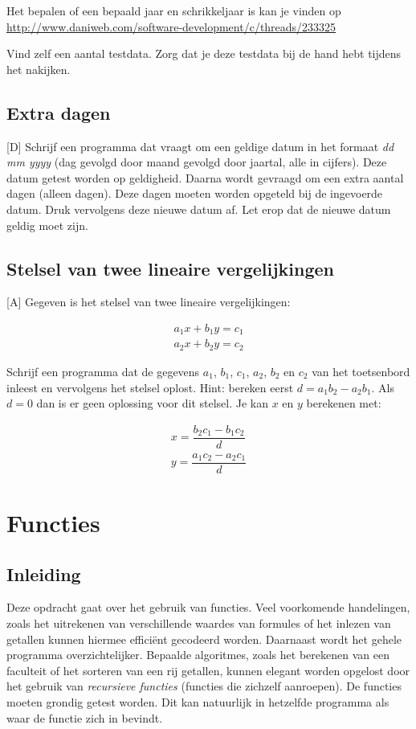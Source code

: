 \documentclass[a4paper,10pt,fleqn,twoside]{article}
\begin{document}
Het bepalen of een bepaald jaar en schrikkeljaar is kan je vinden op \url{http://www.daniweb.com/software-development/c/threads/233325}

Vind zelf een aantal testdata. Zorg dat je deze testdata bij de hand hebt tijdens het nakijken.

\subsection{Extra dagen}[D]
Schrijf een programma dat vraagt om een geldige datum in het formaat \textsl{dd mm yyyy} (dag gevolgd door maand gevolgd door jaartal, alle in cijfers). Deze datum getest worden op geldigheid. Daarna wordt gevraagd om een extra aantal dagen (alleen dagen). Deze dagen moeten worden opgeteld bij de ingevoerde datum. Druk vervolgens deze nieuwe datum af. Let erop dat de nieuwe datum geldig moet zijn.

\subsection{Stelsel van twee lineaire vergelijkingen}[A]
Gegeven is het stelsel van twee lineaire vergelijkingen:

\begin{equation*}
\begin{split}
a_1x + b_1y = c_1\\
a_2x + b_2y = c_2
\end{split}
\end{equation*}

Schrijf een programma dat de gegevens $a_1$, $b_1$, $c_1$, $a_2$, $b_2$ en $c_2$ van het toetsenbord inleest en vervolgens het stelsel oplost. Hint: bereken eerst $d=a_1b_2-a_2b_1$. Als $d=0$ dan is er geen oplossing voor dit stelsel. Je kan $x$ en $y$ berekenen met:

\begin{equation*}
\begin{split}
x = \dfrac{b_2c_1-b_1c_2}{d}\\
y = \dfrac{a_1c_2-a_2c_1}{d}
\end{split}
\end{equation*}

\clearpage
\section{Functies}

\subsection{Inleiding}
Deze opdracht gaat over het gebruik van functies. Veel voorkomende handelingen, zoals het uitrekenen van verschillende waardes van formules of het inlezen van getallen kunnen hiermee efficiënt gecodeerd worden. Daarnaast wordt het gehele programma overzichtelijker. Bepaalde algoritmes, zoals het berekenen van een faculteit of het sorteren van een rij getallen, kunnen elegant worden opgelost door het gebruik van \textsl{recursieve functies} (functies die zichzelf aanroepen). De functies moeten grondig getest worden. Dit kan natuurlijk in hetzelfde programma als waar de functie zich in bevindt.
\end{document}

